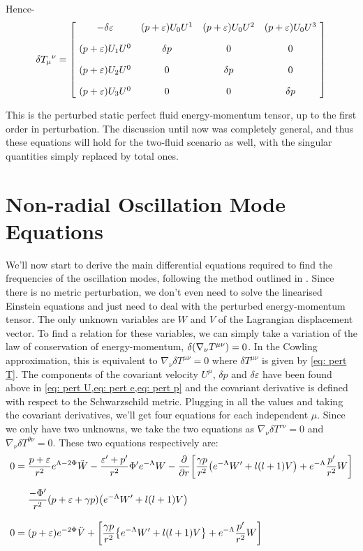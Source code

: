 \documentclass[a4paper,12pt,onehalfspacing]{report}
\begin{document}
Hence- 
\begin{equation}
\delta T_\mu{}^\nu= \begin{bmatrix}
    \ -\delta\varepsilon & \qty(p+\varepsilon)U_0 U^1 & \qty(p+\varepsilon)U_0 U^2 & \qty(p+\varepsilon)U_0 U^3 \ \\[10pt]
    \ \qty(p+\varepsilon)U_1 U^0 & \delta p & 0 & 0 \ \\[10pt]
    \ \qty(p+\varepsilon)U_2 U^0 & 0 & \delta p & 0 \ \\[10pt]
    \ \qty(p+\varepsilon)U_3 U^0 & 0 & 0 & \delta p\ 
\end{bmatrix}\label{eq: pert T}
\end{equation}

This is the perturbed static perfect fluid energy-momentum tensor, up to the first order in perturbation. The discussion until now was completely general, and thus these equations will hold for the two-fluid scenario as well, with the singular quantities simply replaced by total ones.

\section{Non-radial Oscillation Mode Equations}
We'll now start to derive the main differential equations required to find the frequencies of the oscillation modes, following the method outlined in \cite{Sotani}. Since there is no metric perturbation, we don't even need to solve the linearised Einstein equations and just need to deal with the perturbed energy-momentum tensor. The only unknown variables are $W$ and $V$ of the Lagrangian displacement vector. To find a relation for these variables, we can simply take a variation of the law of conservation of energy-momentum, $\delta\qty(\nabla_\nu T^{\mu\nu})=0$. In the Cowling approximation, this is equivalent to $\nabla_\nu\delta T^{\mu\nu}=0$ where $\delta T^{\mu\nu}$ is given by \cref{eq: pert T}. The components of the covariant velocity $U^\mu$, $\delta p$ and $\delta \varepsilon$ have been found above in \cref{eq: pert U,eq: pert e,eq: pert p} and the covariant derivative is defined with respect to the Schwarzschild metric. Plugging in all the values and taking the covariant derivatives, we'll get four equations for each independent $\mu$. Since we only have two unknowns, we take the two equations as $\nabla_\nu\delta T^{r\nu}=0$ and $\nabla_\nu\delta T^{\theta\nu}=0$. These two equations respectively are: 
\begin{align}
    0={}& \frac{p+\varepsilon}{r^2}e^{\Lambda-2\Phi}\ddot{W}-
    \frac{\varepsilon'+p'}{r^2}\Phi' e^{-\Lambda}{W}-
    \pdv{}{r}\qty[\frac{\gamma p}{r^2}\qty(e^{-\Lambda}W'+l(l+1)V)+e^{-\Lambda}\frac{p'}{r^2}W]\nonumber\\[1.5ex]
    {}&\frac{-\Phi'}{r^2}\qty(p+\varepsilon+ \gamma p)\qty(e^{-\Lambda}W'+l(l+1)V)\label{eq: pulse1 step1}\\[2ex]
   0={}& \qty(p+\varepsilon)e^{-2\Phi}\ddot{V}+\qty[\frac{\gamma p}{r^2}\qty{e^{-\Lambda}W'+l(l+1)V}+e^{-\Lambda}\frac{p'}{r^2}W]\label{eq: pulse2 step1}
\end{align}
\end{document}
